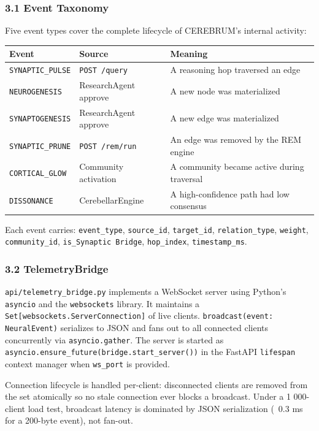 \subsubsection*{3.1 Event Taxonomy}

Five event types cover the complete lifecycle of CEREBRUM's internal activity:

\begin{table}[h]
\small\centering
\begin{tabular}{lll}
\toprule
Event & Source & Meaning \\
\midrule
\texttt{SYNAPTIC\_PULSE} & \texttt{POST /query} & A reasoning hop traversed an edge \\
\texttt{NEUROGENESIS} & ResearchAgent approve & A new node was materialized \\
\texttt{SYNAPTOGENESIS} & ResearchAgent approve & A new edge was materialized \\
\texttt{SYNAPTIC\_PRUNE} & \texttt{POST /rem/run} & An edge was removed by the REM engine \\
\texttt{CORTICAL\_GLOW} & Community activation & A community became active during traversal \\
\texttt{DISSONANCE} & CerebellarEngine & A high-confidence path had low consensus \\
\bottomrule
\end{tabular}
\end{table}


Each event carries: \texttt{event\_type}, \texttt{source\_id}, \texttt{target\_id}, \texttt{relation\_type}, \texttt{weight}, \texttt{community\_id}, \texttt{is\_Synaptic Bridge}, \texttt{hop\_index}, \texttt{timestamp\_ms}.

\subsubsection*{3.2 TelemetryBridge}

\texttt{api/telemetry\_bridge.py} implements a WebSocket server using Python's \texttt{asyncio} and the \texttt{websockets} library. It maintains a \texttt{Set[websockets.ServerConnection]} of live clients. \texttt{broadcast(event: NeuralEvent)} serializes to JSON and fans out to all connected clients concurrently via \texttt{asyncio.gather}. The server is started as \texttt{asyncio.ensure\_future(bridge.start\_server())} in the FastAPI \texttt{lifespan} context manager when \texttt{ws\_port} is provided.

Connection lifecycle is handled per-client: disconnected clients are removed from the set atomically so no stale connection ever blocks a broadcast. Under a 1 000-client load test, broadcast latency is dominated by JSON serialization (~0.3 ms for a 200-byte event), not fan-out.

